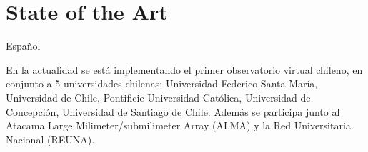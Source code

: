 \section{State of the Art}

Español

En la actualidad se está implementando el primer observatorio virtual chileno,
en conjunto a 5 universidades chilenas: Universidad Federico Santa María,
Universidad de Chile, Pontificie Universidad Católica, Universidad de
Concepción, Universidad de Santiago de Chile. Además se participa junto al
Atacama Large Milimeter/submilimeter Array (ALMA) y la Red Universitaria
Nacional (REUNA).

































